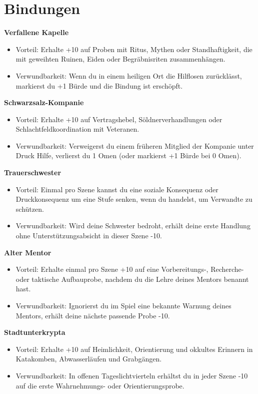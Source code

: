 \section{Bindungen}\label{sec:bindungen}
\noindent\textbf{Verfallene Kapelle}\par
\begin{itemize}[leftmargin=*,nosep]
\item Vorteil: Erhalte +10 auf Proben mit Ritus, Mythen oder Standhaftigkeit, die mit geweihten Ruinen, Eiden oder Begräbnisriten zusammenhängen.
\item Verwundbarkeit: Wenn du in einem heiligen Ort die Hilflosen zurücklässt, markierst du +1 Bürde und die Bindung ist erschöpft.
\end{itemize}
\noindent\textbf{Schwarzsalz-Kompanie}\par
\begin{itemize}[leftmargin=*,nosep]
\item Vorteil: Erhalte +10 auf Vertragshebel, Söldnerverhandlungen oder Schlachtfeldkoordination mit Veteranen.
\item Verwundbarkeit: Verweigerst du einem früheren Mitglied der Kompanie unter Druck Hilfe, verlierst du 1 Omen (oder markierst +1 Bürde bei 0 Omen).
\end{itemize}
\noindent\textbf{Trauerschwester}\par
\begin{itemize}[leftmargin=*,nosep]
\item Vorteil: Einmal pro Szene kannst du eine soziale Konsequenz oder Druckkonsequenz um eine Stufe senken, wenn du handelst, um Verwandte zu schützen.
\item Verwundbarkeit: Wird deine Schwester bedroht, erhält deine erste Handlung ohne Unterstützungsabsicht in dieser Szene -10.
\end{itemize}
\noindent\textbf{Alter Mentor}\par
\begin{itemize}[leftmargin=*,nosep]
\item Vorteil: Erhalte einmal pro Szene +10 auf eine Vorbereitungs-, Recherche- oder taktische Aufbauprobe, nachdem du die Lehre deines Mentors benannt hast.
\item Verwundbarkeit: Ignorierst du im Spiel eine bekannte Warnung deines Mentors, erhält deine nächste passende Probe -10.
\end{itemize}
\noindent\textbf{Stadtunterkrypta}\par
\begin{itemize}[leftmargin=*,nosep]
\item Vorteil: Erhalte +10 auf Heimlichkeit, Orientierung und okkultes Erinnern in Katakomben, Abwasserläufen und Grabgängen.
\item Verwundbarkeit: In offenen Tageslichtvierteln erhältst du in jeder Szene -10 auf die erste Wahrnehmungs- oder Orientierungsprobe.
\end{itemize}


